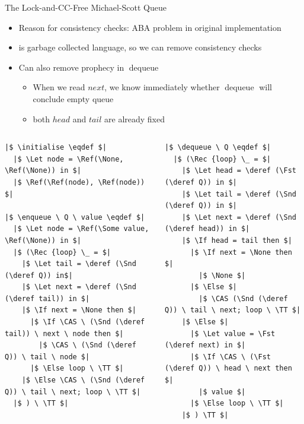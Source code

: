 \documentclass[9pt]{beamer}
\newcommand{\initialise}{\operatorname{initialize}}
\newcommand{\enqueue}{\operatorname{enqueue}}
\newcommand{\dequeue}{\operatorname{dequeue}}
\begin{document}
\begin{frame}[fragile]{The Lock-and-CC-Free Michael-Scott Queue}
  \begin{itemize}
    \item Reason for consistency checks: ABA problem in original implementation
    \item \heaplang{} is garbage collected language, so we can remove consistency checks
    \item Can also remove prophecy in $\dequeue$
      \begin{itemize}
        \item When we read $next$, we know immediately whether $\dequeue$ will conclude empty queue
        \item both $head$ and $tail$ are already fixed
      \end{itemize}
  \end{itemize}
  \begin{columns}
    \begin{column}{0.5\textwidth}
      \begin{verbatim}
|$ \initialise \eqdef $|
  |$ \Let node = \Ref(\None, \Ref(\None)) in $|
  |$ \Ref(\Ref(node), \Ref(node)) $|

|$ \enqueue \ Q \ value \eqdef $|
  |$ \Let node = \Ref(\Some value, \Ref(\None)) in $|
  |$ (\Rec {loop} \_ = $|
    |$ \Let tail = \deref (\Snd (\deref Q)) in$|
    |$ \Let next = \deref (\Snd (\deref tail)) in $|
    |$ \If next = \None then $|
      |$ \If \CAS \ (\Snd (\deref tail)) \ next \ node then $|
        |$ \CAS \ (\Snd (\deref Q)) \ tail \ node $|
      |$ \Else loop \ \TT $|
    |$ \Else \CAS \ (\Snd (\deref Q)) \ tail \ next; loop \ \TT $|
  |$ ) \ \TT $|
      \end{verbatim}
    \end{column}
    \begin{column}{0.5\textwidth}
      \begin{verbatim}
|$ \dequeue \ Q \eqdef $|
  |$ (\Rec {loop} \_ = $|
    |$ \Let head = \deref (\Fst (\deref Q)) in $|
    |$ \Let tail = \deref (\Snd (\deref Q)) in $|
    |$ \Let next = \deref (\Snd (\deref head)) in $|
    |$ \If head = tail then $|
      |$ \If next = \None then $|
        |$ \None $|
      |$ \Else $|
        |$ \CAS (\Snd (\deref Q)) \ tail \ next; loop \ \TT $|
    |$ \Else $|
      |$ \Let value = \Fst (\deref next) in $|
      |$ \If \CAS \ (\Fst (\deref Q)) \ head \ next then $|
        |$ value $|
      |$ \Else loop \ \TT $|
    |$ ) \TT $|
        \end{verbatim}
    \end{column}
  \end{columns}
\end{frame}
\end{document}
